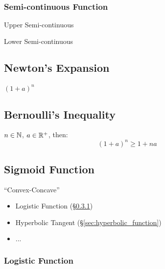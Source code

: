\subsubsection{Semi-continuous Function}\label{sec:semicontinuous_function}

Upper Semi-continuous

Lower Semi-continuous



\subsection{Newton's Expansion}\label{sec:newtons_expansion}


$(1 + a)^n$ %



\subsection{Bernoulli's Inequality}\label{sec:bernoullis_inequality}

$n \in \mathbb{N}$, $a \in \mathbb{R}^+$, then:
\[
  (1 + a)^n \geq 1 + n a
\]


\subsection{Sigmoid Function}\label{sec:sigmoid_function}

``Convex-Concave''

\begin{itemize}
  \item Logistic Function (\S\ref{sec:logistic_function})
  \item Hyperbolic Tangent (\S\ref{sec:hyperbolic_function})
  \item ...
\end{itemize}



\subsubsection{Logistic Function}\label{sec:logistic_function}

